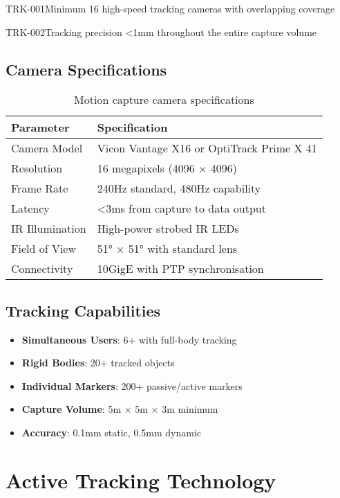 \begin{requirement}{TRK-001}{Minimum 16 high-speed tracking cameras with overlapping coverage}

\begin{requirement}{TRK-002}{Tracking precision <1mm throughout the entire capture volume}

\subsection{Camera Specifications}

\begin{table}[H]
\centering
\begin{tabularx}{\textwidth}{@{}lX@{}}
\toprule
\textbf{Parameter} & \textbf{Specification} \\
\midrule
Camera Model & Vicon Vantage X16 or OptiTrack Prime X 41 \\
Resolution & 16 megapixels (4096 × 4096) \\
Frame Rate & 240Hz standard, 480Hz capability \\
Latency & <3ms from capture to data output \\
IR Illumination & High-power strobed IR LEDs \\
Field of View & 51° × 51° with standard lens \\
Connectivity & 10GigE with PTP synchronisation \\
\bottomrule
\end{tabularx}
\caption{Motion capture camera specifications}
\end{table}

\subsection{Tracking Capabilities}

\begin{itemize}
    \item \textbf{Simultaneous Users}: 6+ with full-body tracking
    \item \textbf{Rigid Bodies}: 20+ tracked objects
    \item \textbf{Individual Markers}: 200+ passive/active markers
    \item \textbf{Capture Volume}: 5m × 5m × 3m minimum
    \item \textbf{Accuracy}: 0.1mm static, 0.5mm dynamic
\end{itemize}

\section{Active Tracking Technology}


\end{requirement}
\end{requirement}
